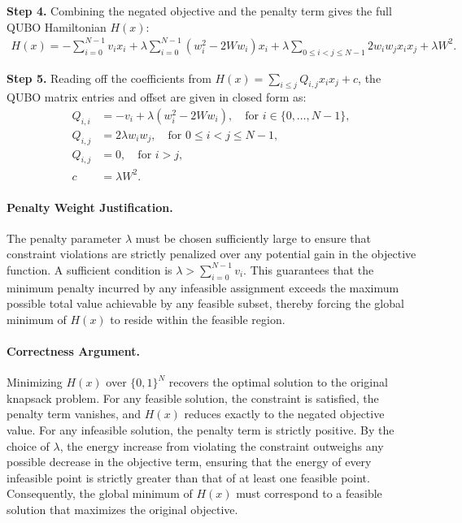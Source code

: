 \documentclass[12pt]{article}
\begin{document}
\textbf{Step 4.} Combining the negated objective and the penalty term gives the full QUBO Hamiltonian $H(x)$:
\begin{align}
    H(x) = -\sum_{i=0}^{N-1} v_i x_i + \lambda \sum_{i=0}^{N-1} (w_i^2 - 2W w_i) x_i + \lambda \sum_{0 \le i < j \le N-1} 2 w_i w_j x_i x_j + \lambda W^2.
\end{align}

\textbf{Step 5.} Reading off the coefficients from $H(x) = \sum_{i \le j} Q_{i,j} x_i x_j + c$, the QUBO matrix entries and offset are given in closed form as:
\begin{align}
    Q_{i,i} &= -v_i + \lambda(w_i^2 - 2W w_i), \quad \text{for } i \in \{0, \dots, N-1\}, \\
    Q_{i,j} &= 2\lambda w_i w_j, \quad \text{for } 0 \le i < j \le N-1, \\
    Q_{i,j} &= 0, \quad \text{for } i > j, \\
    c &= \lambda W^2.
\end{align}

\paragraph{Penalty Weight Justification.}
The penalty parameter $\lambda$ must be chosen sufficiently large to ensure that constraint violations are strictly penalized over any potential gain in the objective function. A sufficient condition is $\lambda > \sum_{i=0}^{N-1} v_i$. This guarantees that the minimum penalty incurred by any infeasible assignment exceeds the maximum possible total value achievable by any feasible subset, thereby forcing the global minimum of $H(x)$ to reside within the feasible region.

\paragraph{Correctness Argument.}
Minimizing $H(x)$ over $\{0,1\}^N$ recovers the optimal solution to the original knapsack problem. For any feasible solution, the constraint is satisfied, the penalty term vanishes, and $H(x)$ reduces exactly to the negated objective value. For any infeasible solution, the penalty term is strictly positive. By the choice of $\lambda$, the energy increase from violating the constraint outweighs any possible decrease in the objective term, ensuring that the energy of every infeasible point is strictly greater than that of at least one feasible point. Consequently, the global minimum of $H(x)$ must correspond to a feasible solution that maximizes the original objective.
\end{document}
